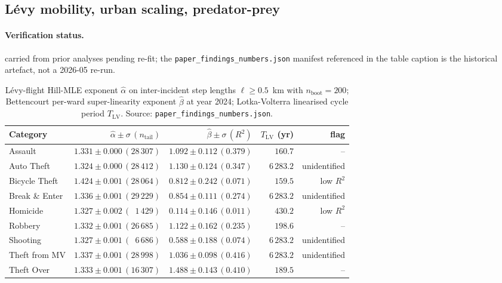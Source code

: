 \documentclass[article,shortnames,nojss]{jss}
\begin{document}
\subsection{Lévy mobility, urban scaling, predator-prey}\label{phys-scaling}


\paragraph*{Verification status.}
carried from prior analyses pending re-fit; the \texttt{paper\_findings\_numbers.json} manifest referenced in the table caption is the historical artefact, not a 2026-05 re-run.

\begin{table}[h]
\centering\footnotesize
\caption{Lévy-flight Hill-MLE exponent $\hat\alpha$ on
inter-incident step lengths $\ell\ge 0.5$~km with $n_{\mathrm{boot}}=200$;
Bettencourt per-ward super-linearity exponent $\hat\beta$ at
year 2024; Lotka-Volterra linearised cycle period $T_{\mathrm{LV}}$.
Source: \texttt{paper\_findings\_numbers.json}.}
\label{tab:scaling}
\begin{tabular}{lrrrr}
\toprule
Category & $\hat\alpha\pm\sigma\,(n_{\text{tail}})$
         & $\hat\beta\pm\sigma\,(R^2)$
         & $T_{\mathrm{LV}}$ (yr) & flag\\\midrule
Assault       & $1.331\pm 0.000\,(28\,307)$ & $1.092\pm 0.112\,(0.379)$ & $\phantom{6\,}160.7$  & --\\
Auto Theft    & $1.324\pm 0.000\,(28\,412)$ & $1.130\pm 0.124\,(0.347)$ & $6\,283.2$ & unidentified\\
Bicycle Theft & $1.424\pm 0.001\,(28\,064)$ & $0.812\pm 0.242\,(0.071)$ & $\phantom{6\,}159.5$  & low $R^2$\\
Break \& Enter& $1.336\pm 0.001\,(29\,229)$ & $0.854\pm 0.111\,(0.274)$ & $6\,283.2$ & unidentified\\
Homicide      & $1.327\pm 0.002\,(\phantom{0}1\,429)$ & $0.114\pm 0.146\,(0.011)$ & $\phantom{6\,}430.2$  & low $R^2$\\
Robbery       & $1.332\pm 0.001\,(26\,685)$ & $1.122\pm 0.162\,(0.235)$ & $\phantom{6\,}198.6$  & --\\
Shooting      & $1.327\pm 0.001\,(\phantom{0}6\,686)$ & $0.588\pm 0.188\,(0.074)$ & $6\,283.2$ & unidentified\\
Theft from MV & $1.337\pm 0.001\,(28\,998)$ & $1.036\pm 0.098\,(0.416)$ & $6\,283.2$ & unidentified\\
Theft Over    & $1.333\pm 0.001\,(16\,307)$ & $1.488\pm 0.143\,(0.410)$ & $\phantom{6\,}189.5$  & --\\
\bottomrule
\end{tabular}
\end{table}
\end{document}
